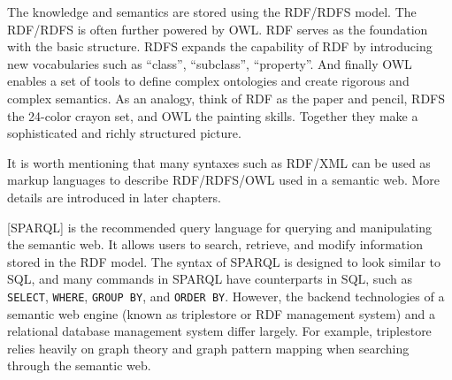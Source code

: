 The knowledge and semantics are stored using the RDF/RDFS model. The RDF/RDFS is often further powered by OWL. RDF serves as the foundation with the basic structure. RDFS expands the capability of RDF by introducing new vocabularies such as ``class'', ``subclass'', ``property''. And finally OWL enables a set of tools to define complex ontologies and create rigorous and complex semantics. As an analogy, think of RDF as the paper and pencil, RDFS the 24-color crayon set, and OWL the painting skills. Together they make a sophisticated and richly structured picture.

It is worth mentioning that many syntaxes such as RDF/XML can be used as markup languages to describe RDF/RDFS/OWL used in a semantic web. More details are introduced in later chapters.

[SPARQL] is the recommended query language for querying and manipulating the semantic web. It allows users to search, retrieve, and modify information stored in the RDF model. The syntax of SPARQL is designed to look similar to SQL, and many commands in SPARQL have counterparts in SQL, such as \verb|SELECT|, \verb|WHERE|, \verb|GROUP BY|, and \verb|ORDER BY|. However, the backend technologies of a semantic web engine (known as triplestore or RDF management system) and a relational database management system differ largely. For example, triplestore relies heavily on graph theory and graph pattern mapping when searching through the semantic web.


